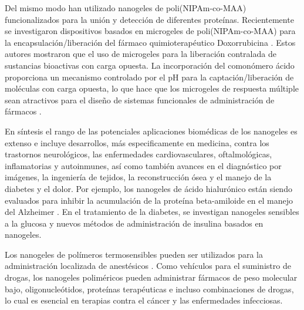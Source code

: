 Del mismo modo \citet{Culver2017A} han utilizado nanogeles de poli(NIPAm-co-MAA) funcionalizados para la uni\'on y detecci\'on de diferentes prote\'inas. 
Recientemente se investigaron dispositivos basados en microgeles de poli(NIPAm-co-MAA) para la encapsulaci\'on/liberaci\'on del f\'armaco quimioterap\'eutico Doxorrubicina \cite{Giussi2020, MartinezMoro2020, Pergushov2020}. Estos autores mostraron que el uso de microgeles para la liberaci\'on contralada de sustancias bioactivas con carga opuesta. 
La incorporaci\'on del comon\'omero \'acido proporciona un mecanismo controlado por el pH para la captaci\'on/liberaci\'on de mol\'eculas con carga opuesta, lo que hace que los microgeles de respuesta m\'ultiple sean atractivos para el dise\~no de sistemas funcionales de administraci\'on de f\'armacos \cite{Liu2017}.

En s\'intesis el  rango de las potenciales aplicaciones biom\'edicas de los nanogeles es extenso e incluye desarrollos, m\'as especificamente en medicina, contra los trastornos neurol\'ogicos, las enfermedades cardiovasculares, oftalmol\'ogicas, inflamatorias y autoinmunes, as\'i como tambi\'en avances en el diagn\'ostico por im\'agenes, la ingenier\'ia de tejidos, la reconstrucci\'on \'osea y el manejo de la diabetes y el dolor. Por ejemplo, los nanogeles de \'acido hialur\'onico est\'an siendo evaluados para inhibir la acumulaci\'on de la prote\'ina beta-amiloide en el manejo del Alzheimer \addcite. En el tratamiento de la diabetes, se investigan nanogeles sensibles a la glucosa \addcite y nuevos m\'etodos de administraci\'on de insulina basados en nanogeles.

Los nanogeles de pol\'imeros termosensibles pueden ser utilizados para la administraci\'on localizada de anest\'esicos \addcite. Como veh\'iculos para el suministro de drogas, los nanogeles polim\'ericos pueden administrar f\'armacos de peso molecular bajo, oligonucle\'otidos, prote\'inas terap\'euticas e incluso combinaciones de drogas, lo cual es esencial en terapias contra el c\'ancer y las enfermedades infecciosas.


